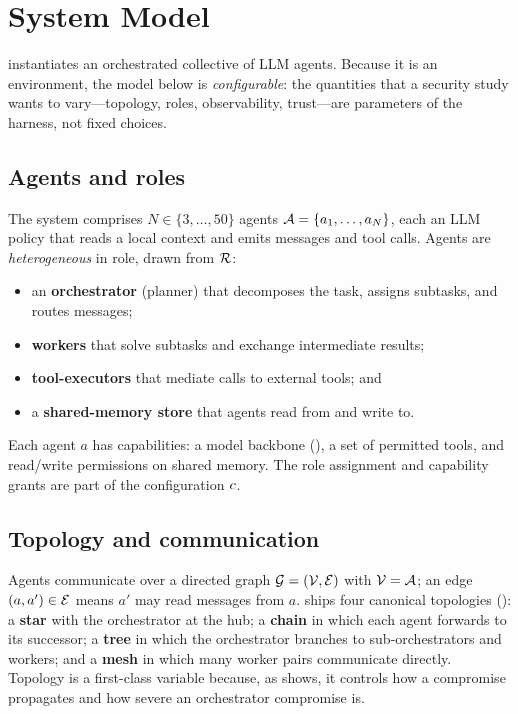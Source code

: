 \section{System Model}
\label{sec:system}

 instantiates an orchestrated collective of LLM agents. Because it is an
environment, the model below is \emph{configurable}: the quantities that a security
study wants to vary---topology, roles, observability, trust---are parameters of the
harness, not fixed choices.

\subsection{Agents and roles}
The system comprises $N\in\{3,\dots,50\}$ agents $\mathcal{A}=\{a_1,\dots,a_N\}$, each an
LLM policy that reads a local context and emits messages and tool calls. Agents are
\emph{heterogeneous} in role, drawn from $\mathcal{R}$:
\begin{itemize}[leftmargin=1.4em]
\item an \textbf{orchestrator} (planner) that decomposes the task, assigns subtasks,
and routes messages;
\item \textbf{workers} that solve subtasks and exchange intermediate results;
\item \textbf{tool-executors} that mediate calls to external tools; and
\item a \textbf{shared-memory store} that agents read from and write to.
\end{itemize}
Each agent $a$ has capabilities: a model backbone (), a set of
permitted tools, and read/write permissions on shared memory. The role assignment and
capability grants are part of the configuration $c$.

\subsection{Topology and communication}
Agents communicate over a directed graph $\mathcal{G}=(\mathcal{V},\mathcal{E})$ with $\mathcal{V}=\mathcal{A}$;
an edge $(a,a')\in\mathcal{E}$ means $a'$ may read messages from $a$.  ships four
canonical topologies (): a \textbf{star} with the orchestrator at
the hub; a \textbf{chain} in which each agent forwards to its successor; a \textbf{tree}
in which the orchestrator branches to sub-orchestrators and workers; and a \textbf{mesh}
in which many worker pairs communicate directly. Topology is a first-class variable
because, as  shows, it controls how a compromise propagates and how
severe an orchestrator compromise is.

